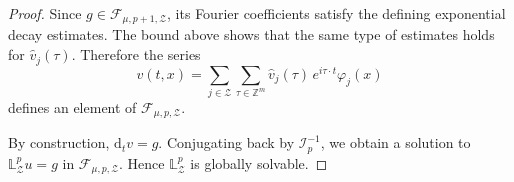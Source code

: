 \documentclass[10pt,a4paper]{amsart}
\begin{document}
\begin{proof}
	Since $g\in\mathscr{F}_{\mu,p+1,\mathcal{Z}}$,
	its Fourier coefficients satisfy the defining exponential decay estimates.
	The bound above shows that the same type of estimates holds for
	$\widehat v_j(\tau)$.
	Therefore the series
	\[
	v(t,x)
	=
	\sum_{j\in\mathcal{Z}}
	\sum_{\tau\in\mathbb{Z}^m}
	\widehat v_j(\tau)\,e^{i\tau\cdot t}\varphi_j(x)
	\]
	defines an element of $\mathscr{F}_{\mu,p,\mathcal{Z}}$.
	
	By construction, $\mathrm{d}_t v=g$. 
	Conjugating back by $\mathscr{I}_p^{-1}$,
	we obtain a solution to $\mathbb{L}^p_{\mathcal{Z}}u=g$ in
	$\mathscr{F}_{\mu,p,\mathcal{Z}}$.
	Hence $\mathbb{L}^p_{\mathcal{Z}}$ is globally solvable.
\end{proof}
\end{document}
